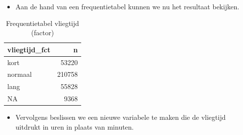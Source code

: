 \documentclass[]{tufte-book}
\newenvironment{Shaded}{}{}
\newcommand{\DataTypeTok}[1]{\textcolor[rgb]{0.56,0.13,0.00}{#1}}
\newcommand{\DecValTok}[1]{\textcolor[rgb]{0.25,0.63,0.44}{#1}}
\newcommand{\KeywordTok}[1]{\textcolor[rgb]{0.00,0.44,0.13}{\textbf{#1}}}
\newcommand{\NormalTok}[1]{#1}
\newcommand{\OperatorTok}[1]{\textcolor[rgb]{0.40,0.40,0.40}{#1}}
\newcommand{\OtherTok}[1]{\textcolor[rgb]{0.00,0.44,0.13}{#1}}
\newcommand{\StringTok}[1]{\textcolor[rgb]{0.25,0.44,0.63}{#1}}
\providecommand{\tightlist}{%
  \setlength{\itemsep}{0pt}\setlength{\parskip}{0pt}}
\begin{document}
\begin{Shaded}
\end{Shaded}

\begin{itemize}
\tightlist
\item
  Aan de hand van een frequentietabel kunnen we nu het resultaat bekijken.
\end{itemize}

\begin{Shaded}
\end{Shaded}

\begin{table}

\caption{\label{tab:5-27b}Frequentietabel vliegtijd (factor)}
\centering
\fontsize{10}{12}\selectfont
\begin{tabular}[t]{lr}
\toprule
vliegtijd\_fct & n\\
\midrule
kort & 53220\\
normaal & 210758\\
lang & 55828\\
NA & 9368\\
\bottomrule
\end{tabular}
\end{table}

\begin{itemize}
\tightlist
\item
  Vervolgens beslissen we een nieuwe variabele te maken die de vliegtijd uitdrukt in uren in plaats van minuten.
\end{itemize}

\begin{Shaded}
\end{Shaded}
\end{document}
